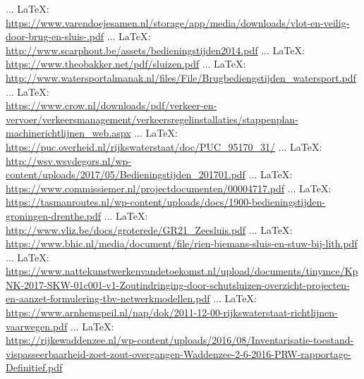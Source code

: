 \begin{thebibliography}{99}
{{{{{{{						%
						 ... \LaTeX:\\ \url{https://www.varendoejesamen.nl/storage/app/media/downloads/vlot-en-veilig-door-brug-en-sluis-.pdf}
						 ... \LaTeX:\\ \url{http://www.scarphout.be/assets/bedieningstijden2014.pdf}
						 ... \LaTeX:\\ \url{https://www.theobakker.net/pdf/sluizen.pdf}
						 ... \LaTeX:\\ \url{http://www.watersportalmanak.nl/files/File/Brugbediengstijden_watersport.pdf}
						 ... \LaTeX:\\ \url{https://www.crow.nl/downloads/pdf/verkeer-en-vervoer/verkeersmanagement/verkeersregelinstallaties/stappenplan-machinerichtlijnen_web.aspx}
						 ... \LaTeX:\\ \url{https://puc.overheid.nl/rijkswaterstaat/doc/PUC_95170_31/}
						 ... \LaTeX:\\ \url{http://wsv.wsvdegors.nl/wp-content/uploads/2017/05/Bedieningstijden_201701.pdf}
						 ... \LaTeX:\\ \url{https://www.commissiemer.nl/projectdocumenten/00004717.pdf}
						 ... \LaTeX:\\ \url{https://tasmanroutes.nl/wp-content/uploads/docs/1900-bedieningstijden-groningen-drenthe.pdf}
						 ... \LaTeX:\\ \url{http://www.vliz.be/docs/groterede/GR21_Zeesluis.pdf}
						 ... \LaTeX:\\ \url{https://www.bhic.nl/media/document/file/rien-biemans-sluis-en-stuw-bij-lith.pdf}
						 ... \LaTeX:\\ \url{https://www.nattekunstwerkenvandetoekomst.nl/upload/documents/tinymce/KpNK-2017-SKW-01c001-v1-Zoutindringing-door-schutsluizen-overzicht-projecten-en-aanzet-formulering-tbv-netwerkmodellen.pdf}
						 ... \LaTeX:\\ \url{https://www.arnhemspeil.nl/nap/dok/2011-12-00-rijkswaterstaat-richtlijnen-vaarwegen.pdf}
						 ... \LaTeX:\\ \url{https://rijkewaddenzee.nl/wp-content/uploads/2016/08/Inventarisatie-toestand-vispasseerbaarheid-zoet-zout-overgangen-Waddenzee-2-6-2016-PRW-rapportage-Definitief.pdf}
}}}}}}}
\end{thebibliography}
